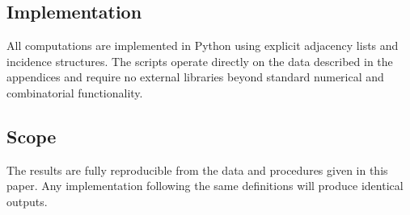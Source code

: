 \subsection{Implementation}

All computations are implemented in Python using explicit adjacency
lists and incidence structures. The scripts operate directly on the
data described in the appendices and require no external libraries
beyond standard numerical and combinatorial functionality.

\subsection{Scope}

The results are fully reproducible from the data and procedures given
in this paper. Any implementation following the same definitions will
produce identical outputs.
